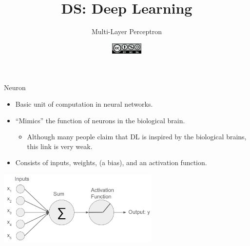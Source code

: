 \documentclass[aspectratio=169]{../latex_main/tntbeamer}  %
\title[DL:Multi-Layer Perceptron]{DS: Deep Learning}
\subtitle{Multi-Layer Perceptron}
\date{\hspace{0.5em} {\includegraphics[height=1.5em]{../latex_main/figures/Cc-by-nc-sa_icon.svg.png}}}
\begin{document}
	
	\maketitle
	\begin{frame}{Neuron}

        \begin{itemize}
            \item Basic unit of computation in neural networks.
            \item ``Mimics'' the function of neurons in the biological brain.
            \begin{itemize}
                \item Although many people claim that DL is inspired by the biological brains, this link is very weak.
            \end{itemize}
            \item Consists of inputs, weights, (a bias), and an activation function.
        \end{itemize}
       
        \centering
        \includegraphics[width=0.6\textwidth]{figures/neuron.png}
                
	\end{frame}
\end{document}
